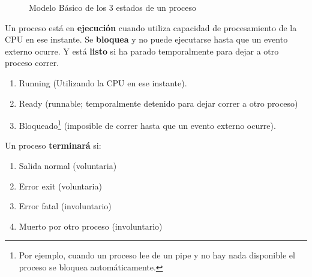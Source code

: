 \documentclass[10pt,portrait, twocolumn]{article}
\begin{document}
\begin{figure}[h]
	\centering
      \caption{Modelo Básico de los 3 estados de un proceso}
  \end{figure}

Un proceso está en \textbf{ejecución} cuando utiliza capacidad de procesamiento de la CPU en ese instante. Se \textbf{bloquea} y no puede ejecutarse hasta que un evento externo ocurre. Y está \textbf{listo} si ha parado temporalmente para dejar a otro proceso correr.\\

	\begin{enumerate}
	\item Running (Utilizando la CPU en ese instante).
	\item Ready (runnable; temporalmente detenido para dejar correr a otro proceso)
	\item Bloqueado\footnote{Por ejemplo, cuando un proceso lee de un pipe y no hay nada disponible el proceso se bloquea automáticamente.} (imposible de correr hasta que un evento externo ocurre).
	\end{enumerate}


Un proceso \textbf{terminará} si:

	\begin{enumerate}
		\item Salida normal (voluntaria)
		\item Error exit (voluntaria)
		\item Error fatal (involuntario)
		\item Muerto por otro proceso (involuntario)
	\end{enumerate}
	
\end{document}
